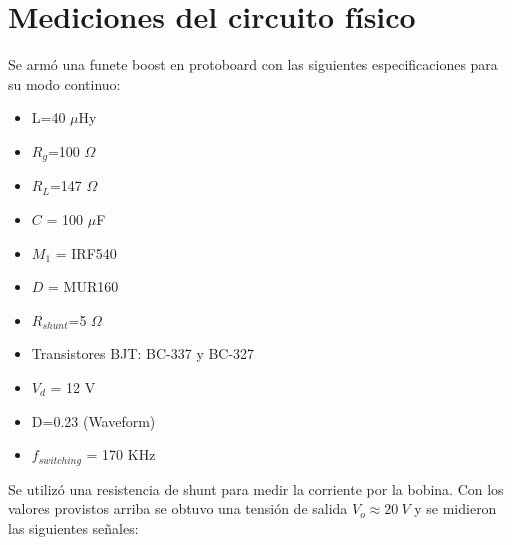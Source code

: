 









\section{Mediciones del circuito físico}
Se armó una funete boost en protoboard con las siguientes especificaciones para su modo continuo:
\begin{itemize}
\item L=40 $\mu$Hy
\item $R_g$=100 $\Omega$
\item $R_L$=147 $\Omega$
\item $C$ = 100 $\mu$F
\item $M_1$ = IRF540
\item $D$ = MUR160
\item $R_{shunt}$=5 $\Omega$
\item Transistores BJT: BC-337 y BC-327
\item $V_d$ = 12 V
\item D=0.23 (Waveform)
\item $f_{switching}$ = 170 KHz
\end{itemize}
Se utilizó una resistencia de shunt para medir la corriente por la bobina.
Con los valores provistos arriba se obtuvo una tensión de salida $V_o \approx 20 \ V$ y se midieron las siguientes señales:



